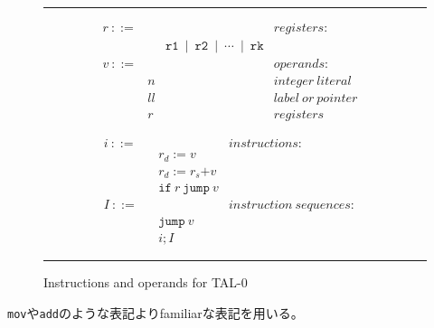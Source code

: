 \documentclass[a4paper,oneside]{ltjsarticle}
\begin{document}
\newpage
\begin{figure}[ht]
	\noindent\hrule{}

	\begin{minipage}[t]{.5\textwidth}
		\begin{flushleft}
			\begin{align*}
				&r\ \mathtt{::=}&&&registers:&\\
			 &&&\mathtt{r1\ \mid\ r2\ \mid\ \cdots\ \mid\ rk}&&&\\
			 &v\ \mathtt{::=}&&&operands:&\\
			 &&n&&integer\ literal&\\
			 &&ll &&label\ or\ pointer&\\
			 &&r&&registers&
			\end{align*}
		\end{flushleft}
	\end{minipage}%
	\vrule{}
	\begin{minipage}[t]{.5\textwidth}
		\begin{flushright}
			\begin{align*}
				&i\ \mathtt{::=}&&&instructions:&\\
			 &&&r_d\mathtt{:=}v&&&\\
			 &&&r_d\mathtt{:=}r_s\mathtt{+}v&&&\\
			 &&&\mathtt{if}\ r\ \mathtt{jump}\ v&&&\\
			 &I\ \mathtt{::=}&&&instruction\ sequences:&\\
			 &&&\mathtt{jump}\ v&&&\\
			 &&&i;I&&&
			\end{align*}
		\end{flushright}
	\end{minipage}

	\noindent\hrule{}
	\caption{Instructions and operands for TAL-0}
\end{figure}

\texttt{mov}や\texttt{add}のような表記よりfamiliarな表記を用いる。
\end{document}

